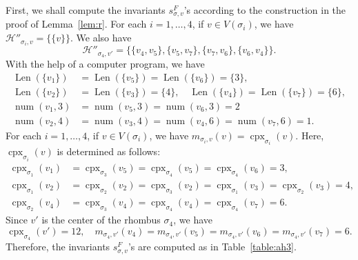 \documentclass[11pt]{article}
\theoremstyle{definition}
\numberwithin{equation}{section}
\begin{document}
First, we shall compute the invariants $s^F _{\sigma, v}$'s according to the construction in the proof of Lemma~\ref{lem:r}. 
For each $i = 1, \ldots , 4$, if $v \in V(\sigma _i)$, we have $\mathcal{H}''_{\sigma _i, v} = \{\{ v \}\}$. 
We also have 
\[
\mathcal{H}''_{\sigma _4, v'} = \{ \{ v_4, v_5 \}, \{ v_5, v_7 \}, \{ v_7, v_6 \}, \{ v_6, v_4 \} \}. 
\]
With the help of a computer program, we have 
\begin{align*}
\operatorname{Len}(\{ v_1 \}) &= 
\operatorname{Len}(\{ v_5 \}) = 
\operatorname{Len}(\{ v_6 \}) =  \{ 3 \}, \\
\operatorname{Len}(\{ v_2 \}) &= 
\operatorname{Len}(\{ v_3 \}) = \{ 4 \}, \quad
\operatorname{Len}(\{ v_4 \}) = 
\operatorname{Len}(\{ v_7 \}) = \{ 6 \}, \\ 
\operatorname{num}(v_1, 3) &= 
\operatorname{num}(v_5, 3) = 
\operatorname{num}(v_6, 3) = 2 \\
\operatorname{num}(v_2, 4) &= 
\operatorname{num}(v_3, 4) = 
\operatorname{num}(v_4, 6) = 
\operatorname{num}(v_7, 6) = 1. 
\end{align*}
For each $i = 1, \ldots , 4$, if $v \in V(\sigma _i)$, 
we have $m_{\sigma _i , v } (v) = \operatorname{cpx}_{\sigma _i}(v)$. 
Here, $\operatorname{cpx}_{\sigma _i}(v)$ is determined as follows: 
\begin{align*}
\operatorname{cpx}_{\sigma _1}(v_1) &= 
\operatorname{cpx}_{\sigma _3}(v_5) = 
\operatorname{cpx}_{\sigma _4}(v_5) = 
\operatorname{cpx}_{\sigma _4}(v_6) = 3, \\
\operatorname{cpx}_{\sigma _1}(v_2) &= 
\operatorname{cpx}_{\sigma _2}(v_2) = 
\operatorname{cpx}_{\sigma _3}(v_2) = 
\operatorname{cpx}_{\sigma _1}(v_3) = 
\operatorname{cpx}_{\sigma _2}(v_3) = 4, \\
\operatorname{cpx}_{\sigma _2}(v_4) &= 
\operatorname{cpx}_{\sigma _3}(v_4) = 
\operatorname{cpx}_{\sigma _4}(v_4) = 
\operatorname{cpx}_{\sigma _4}(v_7) = 6. 
\end{align*}
Since $v'$ is the center of the rhombus $\sigma _4$, we have 
\[
\operatorname{cpx}_{\sigma _4}(v')=12, \quad 
m_{\sigma _4 , v'} (v_4) = m_{\sigma _4 , v'} (v_5) = m_{\sigma _4 , v'} (v_6) = m_{\sigma _4 , v'} (v_7) = 6. 
\]
Therefore, the invariants $s_{\sigma, v} ^F$'s are computed as in Table~\ref{table:ah3}. 
\end{document}
